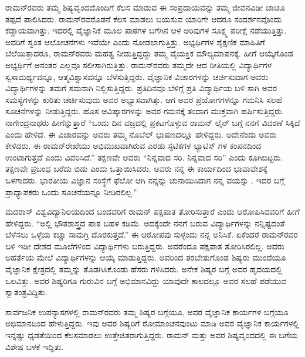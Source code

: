 ರಾಮನ್‍ರವರು ತಮ್ಮ ಶಿಷ್ಯವೃಂದದೊಂದಿಗೆ ಕೆಲಸ ಮಾಡುವ ಈ ಸಂಪ್ರದಾಯವನ್ನು ತಮ್ಮ ಜೀವನವಿಡೀ ಚಾಚೂ ತಪ್ಪದೆ ಪಾಲಿಸಿದರು. ರಾಮನ್‍ರವರೊಡನೆ ಕೆಲಸ ಮಾಡಲು ಬಯಸುವ ಯಾರಿಗೇ ಆದರೂ ಸಂದರ್ಶನವೊಂದು ಕಡ್ಡಾಯವಾಗಿತ್ತು. ಇದರಲ್ಲಿ ವೈಜ್ಞಾನಿಕ ಮೂಲ ಪಾಠಗಳ ಬಗೆಗಿನ ಆಳ ಅರಿವುಗಳ ಸೂಕ್ಷ್ಮ ಪರೀಕ್ಷೆ ನಡೆಯುತ್ತಿತ್ತು. ಅವರಿಗೆ ಸ್ವಂತ ಆಲೋಚನೆಗಳು ಇವೆಯೇ ಎಂದು ನೋಡಲಾಗುತ್ತಿತ್ತು. ಅಭ್ಯರ್ಥಿಗಳ ಶೈಕ್ಷಣಿಕ ಮಾಹಿತಿಗೆ ಬೆಲೆಯಿತ್ತಾದರೂ, ರಾಮನ್‍ರವರು ಮಹತ್ವ ನೀಡುತ್ತಿದ್ದದ್ದು ತಮ್ಮ ವೈಯಕ್ತಿಕ ಮೌಲ್ಯಮಾಪನಕ್ಕೆ. ಹೀಗೆ ಆಯ್ಕೆಗೊಂಡ ಅಭ್ಯರ್ಥಿಗೆ ಅನಂತರ ಎಲ್ಲವೂ ಸಲೀಸಾಗಿರುತ್ತಿತ್ತು. ರಾಮನ್‍ರವರು ತಮ್ಮದೇ ಆದ ರೀತಿಯಲ್ಲಿ ವಿದ್ಯಾರ್ಥಿಗಳ ಸ್ವಸಾಮರ್ಥ್ಯವನ್ನೂ, ಆತ್ಮವಿಶ್ವಾಸವನ್ನೂ ಬೆಳೆಸುತ್ತಿದ್ದರು. ವೈಜ್ಞಾನಿಕ ವಿಚಾರಗಳನ್ನು ಚರ್ಚಿಸುವಾಗ ಅವರು ವಿದ್ಯಾರ್ಥಿಗಳನ್ನು ತಮಗೆ ಸಮನಾಗಿ ನಿಲ್ಲಿಸುತ್ತಿದ್ದರು. ಪ್ರತಿದಿನವೂ ಬೆಳಿಗ್ಗೆ ಪ್ರತಿ ವಿದ್ಯಾರ್ಥಿಯ ಬಳಿ ಸಾಗಿ ಅವರ ಸಮಸ್ಯೆಗಳನ್ನು ಕುರಿತು ಚರ್ಚಿಸುವುದು ಅವರ ಅಭ್ಯಾಸವಾಗಿತ್ತು. ಆಗ ಅವರ ಪ್ರಯೋಗಗಳನ್ನೂ ಗಮನಿಸಿ ಸಲಹೆ ಸೂಚನೆಗಳನ್ನು ನೀಡುತ್ತಿದ್ದರು. ಹೊಸ ಆವಿಷ್ಕಾರಗಳನ್ನು ಅವರ ಗಮನಕ್ಕೆ ತಂದಾಗ ಮುಕ್ತವಾಗಿ ಹರ್ಷಿಸುತ್ತಿದ್ದರು. ನಾಗೇಂದ್ರನಾಥರು ಹೀಗೆನ್ನುತ್ತಾರೆ\enginline{-} “ಒಂದು ದಿನ ವಜ್ರದಲ್ಲಿ ಪ್ರಕಟಗೊಳ್ಳುವ ರಾಮನ್ ಲೈನ್ ಬಗ್ಗೆ ನನಗೆ ವಿವರಣೆ ಸಿಕ್ಕಿದೆ ಎಂದು ಹೇಳಿದೆ. ಈ ವಿಚಾರವನ್ನು ಅವರು ತಮ್ಮ ನೊಬೆಲ್ ಭಾಷಣದಲ್ಲೂ ಹೇಳಿದ್ದರು. ಅದೇನೆಂದು ಅವರು ಕೇಳಿದರು. ಈ ರಾಮನ್‌ರೇಖೆಯು ಅಭಿಮುಖವಾಗಿರುವ ಎರಡು ಸ್ಫಟಿಕಗಳ ಲ್ಯಾಟಿಸ್ ಗಳ ಕಂಪನದಿಂದ ಉಂಟಾಗುತ್ತದೆ ಎಂದು ವಿವರಿಸಿದೆ.” ತಕ್ಷಣವೇ ಅವರು “ನಿನ್ನವಾದ ಸರಿ. ನಿನ್ನವಾದ ಸರಿ” ಎಂದು ಕೂಗಿಬಿಟ್ಟರು. ತಕ್ಷಣವೇ ಪ್ರಬಂಧ ಬರೆದು ಬಿಡು ಎಂದು ಒತ್ತಾಯಿಸಿದರು. ಅವರು ನನ್ನ ಈ ಕಾರ್ಯದಿಂದ ಭಾವಾವೇಶಕ್ಕೆ ಒಳಗಾದರು. ಭಾರತೀಯ ವಿಜ್ಞಾನ ಸಂಸ್ಥೆಗೆ ಫೆಲೋ ಆಗಿ ನನ್ನನ್ನು ಚುನಾಯಿಸಿದಾಗ ನನ್ನ ವಯಸ್ಸು . ಇದರ ಬಗ್ಗೆ ಪ್ರಾಧ್ಯಾಪಕರು ಒಂದು ಸೂಚನೆಯನ್ನೂ ನೀಡಿರಲಿಲ್ಲ.”

ಮದರಾಸ್ ವಿಶ್ವವಿದ್ಯಾನಿಲಯದಿಂದ ಬಂದವರಿಗೆ ರಾಮನ್ ಪಕ್ಷಪಾತ ತೋರಿಸುತ್ತಾರೆ ಎಂದು ಆರೋಪಿಸಿದವರಿಗೆ ಹೀಗೆ ಹೇಳಿದ್ದರು.\enginline{-} “ಅಲ್ಲಿ ಭೌತಶಾಸ್ತ್ರದ ಪಾಠ ಬಹಳ ಕಡಿಮೆ. ಅದಕ್ಕೆಂದೇ ನನಗೆ ಬರುವ ವಿದ್ಯಾರ್ಥಿಗಳನ್ನು ನನ್ನಿಷ್ಟದಂತೆ ಬೆಳೆಸಲು ಒಳ್ಳೆಯ ಕಚ್ಚಾ ಸಾಮಗ್ರಿ ದೊರಕುತ್ತದೆ.” ಈ ಆರೋಪವು ಸುಳ್ಳೆಂದು ನನ್ನ ಅನಿಸಿಕೆ. ಏಕೆಂದರೆ ರಾಮನ್‍ರವರ ಬಳಿ ಇಡೀ ದೇಶದ ಮೂಲೆಗಳಿಂದ ವಿದ್ಯಾರ್ಥಿಗಳು ಬರುತ್ತಿದ್ದರು. ಅವರೆಂದೂ ಪಕ್ಷಪಾತ ತೋರಿಸಿರಲಿಲ್ಲ. ಅವರು ಅಹರ್ತೆಯ ಮೇಲೆ ವಿದ್ಯಾರ್ಥಿಗಳನ್ನು ಆಯ್ಕೆ ಮಾಡುತ್ತಿದ್ದರು. ಅವರಿಂದ ತರಬೇತುಗೊಂಡ ಶಿಷ್ಯರು ಮುಂದೆಯೂ ವೈಜ್ಞಾನಿಕ ಕ್ಷೇತ್ರದಲ್ಲಿ ತಮ್ಮನ್ನು ತೊಡಗಿಸಿಕೊಂಡು ಹೆಸರು ಗಳಿಸಿದರು. ಅನೇಕ ಶಿಷ್ಯರ ಬಗ್ಗೆ ಅವರ ಹೃದಯದಲ್ಲಿ ಒಲವಿತ್ತು. ಅವರ ಶಿಷ್ಯರಿಗೂ ಗುರುವಿನ ಬಗ್ಗೆ ಅಭಿಮಾನವಿದ್ದು ಯಾವುದೇ ಕಾಲದಲ್ಲೂ ಅವರ ಸಲಹೆ ಪಡೆಯುವ ಸ್ವಾತಂತ್ರವಿದ್ದಿತು.

ಸಾರ್ವಜನಿಕ ಉಪನ್ಯಾಸಗಳಲ್ಲಿ ರಾಮನ್‍ರವರು ತಮ್ಮ ಶಿಷ್ಯರ ಬಗ್ಗೆಯೂ, ಅವರ ವೈಜ್ಞಾನಿಕ ಕಾರ್ಯಗಳ ಬಗ್ಗೆಯೂ ಅಭಿಮಾನದಿಂದ ಹೇಳುತ್ತಿದ್ದರು. ಇವು ಅವರ ಶಿಷ್ಯರಿಗೆ ರೋಮಾಂಚನ\-ವುಂಟು ಮಾಡಿ ಅವರ ವೈಜ್ಞಾನಿಕ ಕಾರ್ಯಗಳಲ್ಲಿ ಇನ್ನಷ್ಟು ಧೃಡತೆಯಿಂದ ಕೆಲಸಮಾಡಲು ಉತ್ತೇಜಿತ\-ರಾಗುತ್ತಿದ್ದರು. ರಾಮನ್ ಮತ್ತು ಅವರ ಶಿಷ್ಯವೃಂದದಲ್ಲಿ ಈ ಬಗೆಯ ವಿಶೇಷ ಬಳಕೆ ಇದ್ದಿತು.



